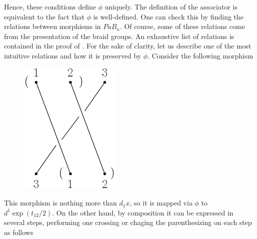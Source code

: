 \documentclass[TFM.tex]{subfiles}
\begin{document}
Hence, these conditions define $\phi$ uniquely. %
The definition of the associator is equivalent to the fact that $\phi$ is well-defined. One can check this by finding the relations between morphisms in $PaB_n$. Of course, some of these relations come from the presentation of the braid groups. An exhaustive list of relations is contained in the proof of  \cite[Proposition 3.4]{1deTamarkin}. For the sake of clarity, let us describe one of the most intuitive relations and how it is preserved by $\phi$. Consider the following morphism

\begin{figure}[h!]
\includegraphics[scale=0.53]{Imagenes/left}
\end{figure}
This morphism is nothing more than $d_1x$, so it is mapped via $\phi$ to $d^1\exp(t_{12}/2)$. On the other hand, by composition it can be expressed in several steps, performing one crossing or chaging the parenthesizing on each step as follows
\end{document}
